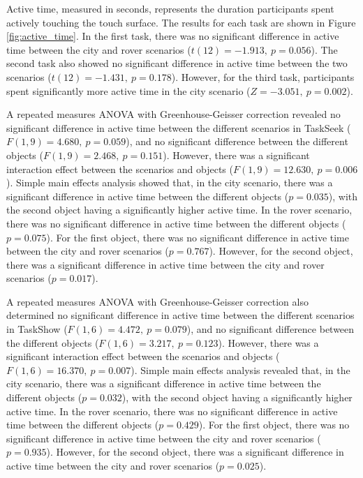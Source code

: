             Active time, measured in seconds, represents the duration participants spent actively touching the touch surface. The results for each task are shown in Figure \ref{fig:active_time}. In the first task, there was no significant difference in active time between the city and rover scenarios ($t(12) = -1.913,\ p = 0.056$). The second task also showed no significant difference in active time between the two scenarios ($t(12) = -1.431,\ p = 0.178$). However, for the third task, participants spent significantly more active time in the city scenario ($Z = -3.051,\ p=0.002$).

            A repeated measures ANOVA with Greenhouse-Geisser correction revealed no significant difference in active time between the different scenarios in TaskSeek ($F(1, 9) = 4.680,\ p = 0.059$), and no significant difference between the different objects ($F(1, 9) = 2.468,\ p = 0.151$). However, there was a significant interaction effect between the scenarios and objects ($F(1, 9) = 12.630,\ p = 0.006$). Simple main effects analysis showed that, in the city scenario, there was a significant difference in active time between the different objects ($p=0.035$), with the second object having a significantly higher active time. In the rover scenario, there was no significant difference in active time between the different objects ($p=0.075$). For the first object, there was no significant difference in active time between the city and rover scenarios ($p=0.767$). However, for the second object, there was a significant difference in active time between the city and rover scenarios ($p=0.017$).

            A repeated measures ANOVA with Greenhouse-Geisser correction also determined no significant difference in active time between the different scenarios in TaskShow ($F(1, 6) = 4.472,\ p = 0.079$), and no significant difference between the different objects ($F(1, 6) = 3.217,\ p = 0.123$). However, there was a significant interaction effect between the scenarios and objects ($F(1, 6) = 16.370,\ p = 0.007$). Simple main effects analysis revealed that, in the city scenario, there was a significant difference in active time between the different objects ($p=0.032$), with the second object having a significantly higher active time. In the rover scenario, there was no significant difference in active time between the different objects ($p=0.429$). For the first object, there was no significant difference in active time between the city and rover scenarios ($p=0.935$). However, for the second object, there was a significant difference in active time between the city and rover scenarios ($p=0.025$).

